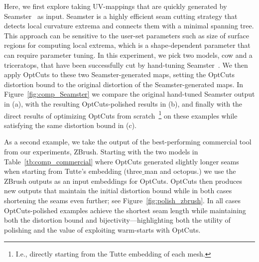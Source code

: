 
Here, we first explore taking UV-mappings that are quickly generated by   Seamster~\cite{Sheffer2002Seamster} as input. Seamster is a highly efficient seam cutting strategy that detects local curvature extrema and connects them with a minimal spanning tree. This approach can be sensitive to the user-set parameters such as size of surface regions for computing local extrema, which is a shape-dependent parameter that can require parameter tuning. In this experiment, we pick two models, cow and a triceratops, that have been successfully cut by hand-tuning Seamster\ \cite{Sheffer2002Seamster}. We then apply OptCuts to these two Seamster-generated maps, setting the OptCuts distortion bound to the original distortion of the Seamster-generated maps. In Figure~\ref{fig:comp_Seamster} we compare the original hand-tuned Seamster output in (a), with the resulting OptCuts-polished results in (b), and finally with the direct results of optimizing OptCuts from scratch~\footnote{I.e., directly starting from the Tutte embedding of each mesh.} on these examples while satisfying the same distortion bound in (c). 

As a second example, we take the output of the best-performing commercial tool from our experiments, ZBrush. Starting with the two models in Table~\ref{tb:comp_commercial} where OptCuts generated slightly longer seams when starting from Tutte's embedding (three$\_$man and octopus.) we use the ZBrush outputs as an input embeddings for OptCuts. OptCuts then produces new outputs that maintain the initial distortion bound while in both cases shortening the seams even further; see Figure~\ref{fig:polish_zbrush}. In all cases OptCuts-polished examples achieve the shortest seam length while maintaining both the distortion bound and bijectivity---highlighting both the utility of polishing and the value of exploiting warm-starts with OptCuts.

